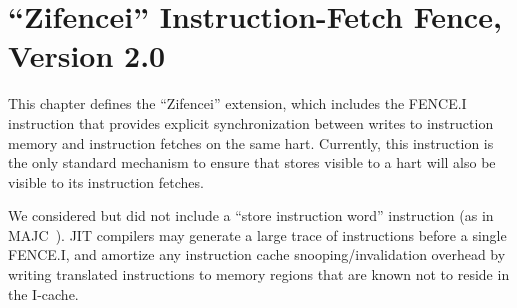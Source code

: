 \chapter{``Zifencei'' Instruction-Fetch Fence, Version 2.0}
\label{chap:zifencei}

This chapter defines the ``Zifencei'' extension, which includes the
FENCE.I instruction that provides explicit synchronization between
writes to instruction memory and instruction fetches on the same hart.
Currently, this instruction is the only standard mechanism to ensure
that stores visible to a hart will also be visible to its instruction
fetches.

\begin{commentary}
We considered but did not include a ``store instruction word''
instruction (as in MAJC~\cite{majc}).  JIT compilers may generate a
large trace of instructions before a single FENCE.I, and amortize any
instruction cache snooping/invalidation overhead by writing translated
instructions to memory regions that are known not to reside in the
I-cache.
\end{commentary}

